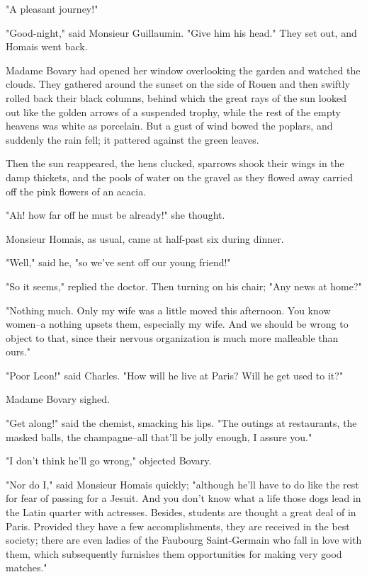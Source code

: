 \documentclass[11pt,twocolumn]{ltugboat}
\begin{document}
"A pleasant journey!"

"Good-night," said Monsieur Guillaumin. "Give him his head." They set
out, and Homais went back.

Madame Bovary had opened her window overlooking the garden and watched
the clouds. They gathered around the sunset on the side of Rouen and
then swiftly rolled back their black columns, behind which the great
rays of the sun looked out like the golden arrows of a suspended trophy,
while the rest of the empty heavens was white as porcelain. But a gust
of wind bowed the poplars, and suddenly the rain fell; it pattered
against the green leaves.

Then the sun reappeared, the hens clucked, sparrows shook their wings in
the damp thickets, and the pools of water on the gravel as they flowed
away carried off the pink flowers of an acacia.

"Ah! how far off he must be already!" she thought.

Monsieur Homais, as usual, came at half-past six during dinner.

"Well," said he, "so we've sent off our young friend!"

"So it seems," replied the doctor. Then turning on his chair; "Any news
at home?"

"Nothing much. Only my wife was a little moved this afternoon. You know
women--a nothing upsets them, especially my wife. And we should be
wrong to object to that, since their nervous organization is much more
malleable than ours."

"Poor Leon!" said Charles. "How will he live at Paris? Will he get used
to it?"

Madame Bovary sighed.

"Get along!" said the chemist, smacking his lips. "The outings at
restaurants, the masked balls, the champagne--all that'll be jolly
enough, I assure you."

"I don't think he'll go wrong," objected Bovary.

"Nor do I," said Monsieur Homais quickly; "although he'll have to do
like the rest for fear of passing for a Jesuit. And you don't know what
a life those dogs lead in the Latin quarter with actresses. Besides,
students are thought a great deal of in Paris. Provided they have a few
accomplishments, they are received in the best society; there are even
ladies of the Faubourg Saint-Germain who fall in love with them, which
subsequently furnishes them opportunities for making very good matches."
\end{document}
